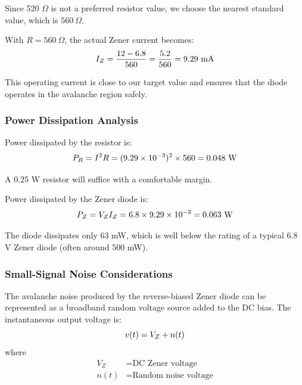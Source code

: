 \documentclass[12pt,a4paper]{report}
\begin{document}
	Since 520 $\Omega$ is not a preferred resistor value, we choose the nearest standard value, which is $560\ \Omega$.
	
	With $R = 560\ \Omega$, the actual Zener current becomes:
	\begingroup
	\setlength{\mathindent}{0pt}
	\begin{equation*}
		\hfill
		I_Z = \frac{12 - 6.8}{560} = \frac{5.2}{560} = 9.29\ \text{mA}
		\hfill
	\end{equation*}
	\endgroup
	
	This operating current is close to our target value and ensures that the diode operates in the avalanche region safely.
	
	\subsubsection{Power Dissipation Analysis}
	Power dissipated by the resistor is:
	\begingroup
	\setlength{\mathindent}{0pt}
	\begin{equation*}
		\hfill
		P_R = I^2R = (9.29 \times 10^{-3})^2 \times 560 = 0.048\ \text{W}
		\hfill
	\end{equation*}
	\endgroup
	
	A 0.25 W resistor will suffice with a comfortable margin.
	
	Power dissipated by the Zener diode is:
	\begingroup
	\setlength{\mathindent}{0pt}
	\begin{equation*}
		\hfill
		P_Z = V_Z I_Z = 6.8 \times 9.29 \times 10^{-3} = 0.063\ \text{W}
		\hfill
	\end{equation*}
	\endgroup
	
	The diode dissipates only 63 mW, which is well below the rating of a typical 6.8 V Zener diode (often around 500 mW).
	\subsubsection{Small-Signal Noise Considerations}
	The avalanche noise produced by the reverse-biased Zener diode can be represented as a broadband random voltage source added to the DC bias. The instantaneous output voltage is:
	\begingroup
	\setlength{\mathindent}{0pt}
	\begin{equation*}
		\hfill
		v(t) = V_Z + n(t)
		\hfill
	\end{equation*}
	\endgroup
	where
	\begin{align*}
		V_Z &= \text{DC Zener voltage} \\
		n(t) &= \text{Random noise voltage}
	\end{align*}
	
\end{document}
